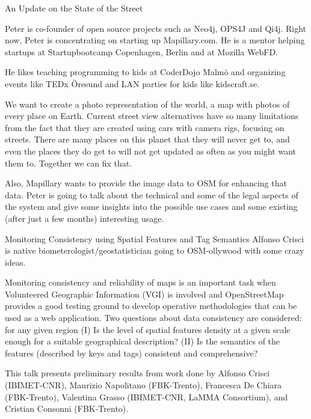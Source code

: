 %
{An Update on the State of the Street}%
{Peter is co-founder of open source projects such as Neo4j, OPS4J and Qi4j. Right now, Peter is concentrating on starting up Mapillary.com. He is a mentor helping startups at Startupbootcamp Copenhagen, Berlin and at Mozilla WebFD. 

He likes teaching programming to kids at CoderDojo Malmö and organizing events like TEDx Öresund and LAN parties for kids like kidscraft.se.}%
{We want to create a photo representation of the world, a map with photos of every place on Earth. Current street view alternatives have so many limitations from the fact that they are created using cars with camera rigs, focusing on streets. There are many places on this planet that they will never get to, and even the places they do get to will not get updated as often as you might want them to. Together we can fix that. 

Also, Mapillary wants to provide the image data to OSM for enhancing that data. 
Peter is going to talk about the technical and some of the legal aspects of the system and give some insights into the possible use cases and some existing (after just a few months) interesting usage.}

%
{Monitoring Consistency using Spatial Features and Tag Semantics}%
{Alfonso Crisci is native biometerologist/geostatistician going to OSM-ollywood with some crazy ideas.}%
{Monitoring consistency and reliability of maps is an important task when Volunteered Geographic Information (VGI) is involved and OpenStreetMap provides a good testing ground to develop operative methodologies that can be used as a web application. Two questions about data consistency are considered: for any given region (I) Is the level of spatial features density at a given scale enough for a suitable geographical description? (II) Is the semantics of the features (described by keys and tags) consistent and comprehensive?

This talk presents preliminary results from work done by Alfonso Crisci (IBIMET-CNR), Maurizio Napolitano (FBK-Trento), Francesca De Chiara (FBK-Trento), Valentina Gras\-so (IBIMET-CNR, LaMMA Consortium), and Cristian Consonni (FBK-Trento).}

